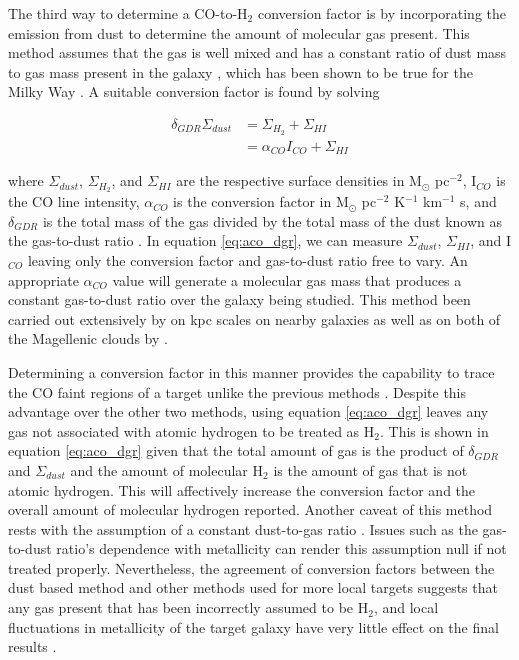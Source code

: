 The third way to determine a CO-to-H$_2$ conversion factor is by incorporating the emission from dust to determine the amount of molecular gas present.  This method assumes that the gas is well mixed and has a constant ratio of dust mass to gas mass present in the galaxy \citep{leroy2011}, which has been shown to be true for the Milky Way \citep{boulanger1996}.  A suitable conversion factor is found by solving 

\begin{equation}\label{eq:aco_dgr}
  \begin{split}
    \delta_{GDR}\Sigma_{dust} & = \Sigma_{H_2} + \Sigma_{HI} \\
    						  & = \alpha_{CO} I_{CO} + \Sigma_{HI} 
  \end{split}
\end{equation}

\noindent where $\Sigma_{dust}$, $\Sigma_{H_2}$, and $\Sigma_{HI}$ are the respective surface densities in M$_\odot$ pc$^{-2}$, I$_{CO}$ is the CO line intensity, $\alpha_{CO}$ is the conversion factor in M$_\odot$ pc$^{-2}$ K$^{-1}$ km$^{-1}$ s, and $\delta_{GDR}$ is the total mass of the gas divided by the total mass of the dust known as the gas-to-dust ratio \citep{leroy2011,sandstrom2013}.  In equation \ref{eq:aco_dgr}, we can measure $\Sigma_{dust}$, $\Sigma_{HI}$, and I$_{CO}$ leaving only the conversion factor and gas-to-dust ratio free to vary.  An appropriate $\alpha_{CO}$ value will generate a molecular gas mass that produces a constant gas-to-dust ratio over the galaxy being studied. This method been carried out extensively by \cite{sandstrom2013} on kpc scales on nearby galaxies as well as on both of the Magellenic clouds by \cite{leroy2011}.

Determining a conversion factor in this manner provides the capability to trace the CO faint regions of a target unlike the previous methods \citep{israel1997}.  Despite this advantage over the other two methods, using equation \ref{eq:aco_dgr} leaves any gas not associated with atomic hydrogen to be treated as H$_2$.  This is shown in equation \ref{eq:aco_dgr} given that the total amount of gas is the product of $\delta_{GDR}$ and $\Sigma_{dust}$ and the amount of molecular H$_2$ is the amount of gas that is not atomic hydrogen.  This will affectively increase the conversion factor and the overall amount of molecular hydrogen reported\citep{bolatto2013}.  Another caveat of this method rests with the assumption of a constant dust-to-gas ratio \citep{bolatto2013}.  Issues such as the gas-to-dust ratio's dependence with metallicity \citep{draine2007} can render this assumption null if not treated properly.  Nevertheless, the agreement of conversion factors between the dust based method and other methods used for more local targets suggests that any gas present that has been incorrectly assumed to be H$_2$, and local fluctuations in metallicity of the target galaxy have very little effect on the final results \citep{bolatto2013}.


